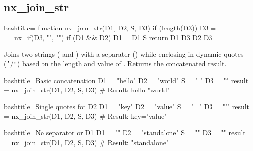 \newpage
\subsection{nx_join_str}
\label{nx_join_str}
\begin{NexCodeBox}{bash}{title={}}
function nx_join_str(D1, D2, S, D3) {
	if (length(D3))
		D3 = __nx_if(D3, "", "")
	if (D1 && D2)
		D1 = D1 S
	return D1 D3 D2 D3
}
\end{NexCodeBox}

\begin{NexMainBox}
	\begin{NexMainBox}
		Joins two strings ( and ) with a separator () while enclosing  in dynamic quotes (\texttt{'}/\texttt{"}) based on the length and value of . Returns the concatenated result.
	\end{NexMainBox}
	\begin{NexMainBox}
		\begin{NexListDark}
		\end{NexListDark}
	\end{NexMainBox}
\end{NexMainBox}

\begin{NexCodeBox}{bash}{title={Basic concatenation}}
	D1 = "hello"
	D2 = "world"
	S = " "
	D3 = "\""
	result = nx_join_str(D1, D2, S, D3)
	# Result: hello "world"
\end{NexCodeBox}

\begin{NexCodeBox}{bash}{title={Single quotes for D2}}
	D1 = "key"
	D2 = "value"
	S = "="
	D3 = "'"
	result = nx_join_str(D1, D2, S, D3)
	# Result: key='value'
\end{NexCodeBox}

\begin{NexCodeBox}{bash}{title={No separator or D1}}
	D1 = ""
	D2 = "standalone"
	S = ""
	D3 = "\""
	result = nx_join_str(D1, D2, S, D3)
	# Result: "standalone"
\end{NexCodeBox}

